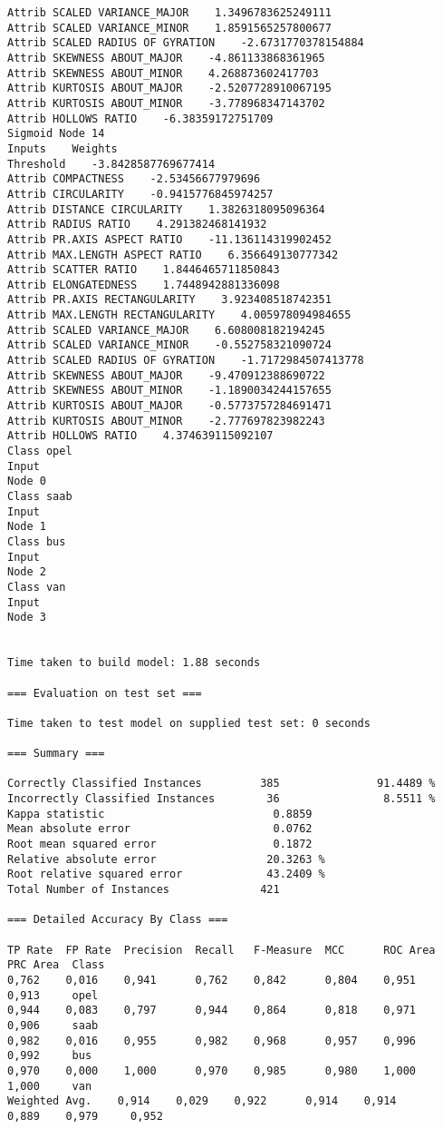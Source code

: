 \documentclass[
	article,			%
	11pt,				%
	oneside,			%
	a4paper,			%
	english,			%
	brazil,				%
	sumario=tradicional
	]{abntex2}
\begin{document}
\begin{lstlisting}
Attrib SCALED VARIANCE_MAJOR    1.3496783625249111
Attrib SCALED VARIANCE_MINOR    1.8591565257800677
Attrib SCALED RADIUS OF GYRATION    -2.6731770378154884
Attrib SKEWNESS ABOUT_MAJOR    -4.861133868361965
Attrib SKEWNESS ABOUT_MINOR    4.268873602417703
Attrib KURTOSIS ABOUT_MAJOR    -2.5207728910067195
Attrib KURTOSIS ABOUT_MINOR    -3.778968347143702
Attrib HOLLOWS RATIO    -6.38359172751709
Sigmoid Node 14
Inputs    Weights
Threshold    -3.8428587769677414
Attrib COMPACTNESS    -2.53456677979696
Attrib CIRCULARITY    -0.9415776845974257
Attrib DISTANCE CIRCULARITY    1.3826318095096364
Attrib RADIUS RATIO    4.291382468141932
Attrib PR.AXIS ASPECT RATIO    -11.136114319902452
Attrib MAX.LENGTH ASPECT RATIO    6.356649130777342
Attrib SCATTER RATIO    1.8446465711850843
Attrib ELONGATEDNESS    1.7448942881336098
Attrib PR.AXIS RECTANGULARITY    3.923408518742351
Attrib MAX.LENGTH RECTANGULARITY    4.005978094984655
Attrib SCALED VARIANCE_MAJOR    6.608008182194245
Attrib SCALED VARIANCE_MINOR    -0.552758321090724
Attrib SCALED RADIUS OF GYRATION    -1.7172984507413778
Attrib SKEWNESS ABOUT_MAJOR    -9.470912388690722
Attrib SKEWNESS ABOUT_MINOR    -1.1890034244157655
Attrib KURTOSIS ABOUT_MAJOR    -0.5773757284691471
Attrib KURTOSIS ABOUT_MINOR    -2.777697823982243
Attrib HOLLOWS RATIO    4.374639115092107
Class opel
Input
Node 0
Class saab
Input
Node 1
Class bus
Input
Node 2
Class van
Input
Node 3


Time taken to build model: 1.88 seconds

=== Evaluation on test set ===

Time taken to test model on supplied test set: 0 seconds

=== Summary ===

Correctly Classified Instances         385               91.4489 %
Incorrectly Classified Instances        36                8.5511 %
Kappa statistic                          0.8859
Mean absolute error                      0.0762
Root mean squared error                  0.1872
Relative absolute error                 20.3263 %
Root relative squared error             43.2409 %
Total Number of Instances              421     

=== Detailed Accuracy By Class ===

TP Rate  FP Rate  Precision  Recall   F-Measure  MCC      ROC Area  PRC Area  Class
0,762    0,016    0,941      0,762    0,842      0,804    0,951     0,913     opel
0,944    0,083    0,797      0,944    0,864      0,818    0,971     0,906     saab
0,982    0,016    0,955      0,982    0,968      0,957    0,996     0,992     bus
0,970    0,000    1,000      0,970    0,985      0,980    1,000     1,000     van
Weighted Avg.    0,914    0,029    0,922      0,914    0,914      0,889    0,979     0,952     


\end{lstlisting}
\end{document}
